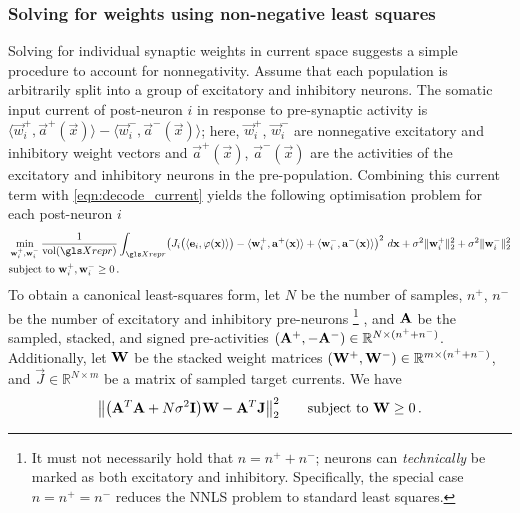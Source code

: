 \subsubsection{Solving for weights using non-negative least squares}
Solving for individual synaptic weights in current space suggests a simple procedure to account for nonnegativity.
Assume that each population is arbitrarily split into a group of excitatory and inhibitory neurons.
The somatic input current of post-neuron $i$ in response to pre-synaptic activity is $\langle \vec w_i^+, \vec a^+(\vec x) \rangle - \langle \vec w_i^-, \vec a^-(\vec x) \rangle$;
here, $\vec w_i^+$, $\vec w_i^-$ are nonnegative excitatory and inhibitory weight vectors and $\vec a^+(\vec x)$, $\vec a^-(\vec x)$ are the activities of the excitatory and inhibitory neurons in the pre-population.
Combining this current term with \cref{eqn:decode_current} yields the following optimisation problem for each post-neuron $i$
\begin{align}
	\begin{aligned}
	& \min_{{\vec w}_i^+, {\vec w}_i^-}
	\frac{1}{\vol(\Xrepr)} \int_{\Xrepr} \!
	\left(
		J_i\bigl(\langle \vec e_i, \phi(\vec x) \rangle\bigr)
		- \langle \vec w_{i}^+, \vec a^+(\vec x) \rangle
		+ \langle \vec w_{i}^-, \vec a^-(\vec x) \rangle
	\right)^2 \, d\vec x + \sigma^2 \|\vec w_{i}^+\|_2^2 + \sigma^2 \|\vec w_{i}^-\|_2^2 \\
	& \text{subject to } \vec w_i^+, \vec w_i^- \geq 0 \,.
	\end{aligned}
	\label{eqn:decode_nonneg}
\end{align}
To obtain a canonical least-squares form, let $N$ be the number of samples, $n^+$, $n^-$ be the number of excitatory and inhibitory pre-neurons%
\footnote{
It must not necessarily hold that $n = n^+ + n^-$; neurons can \emph{technically} be marked as both excitatory and inhibitory. Specifically, the special case $n = n^+ = n^-$ reduces the NNLS problem to standard least squares.
}%
, and $\mathbf{A}$ be the sampled, stacked, and signed pre-activities $(\mathbf{A}^+, -\mathbf{A}^-) \in \mathbb{R}^{N \times (n^+ + n^-)}$.
Additionally, let $\mathbf{W}$ be the stacked weight matrices $(\mathbf{W}^+, \mathbf{W}^-) \in \mathbb{R}^{m \times (n^+ + n^-)}$, and $\vec J \in \mathbb{R}^{N \times m}$ be a matrix of sampled target currents. We have
\begin{align}
	\bigl\| \bigl( \mathbf{A}^T \mathbf{A} + N \sigma^2 \mathbf{I} \bigr) \mathbf{W} - \mathbf{A}^T \mathbf{J} \bigr\|_2^2 \quad\quad \text{subject to } \mathbf{W} \geq 0 \,.
	\label{eqn:decode_nonneg_canon}
\end{align}
